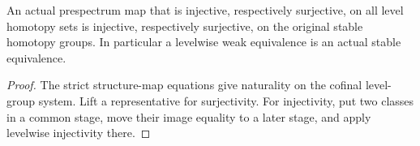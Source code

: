 \begin{proposition}
  \label{prop:actual-levelwise-stable-equivalences}
  \leanok
  An actual prespectrum map that is injective, respectively surjective, on all level homotopy sets is injective, respectively surjective, on the original stable homotopy groups. In particular a levelwise weak equivalence is an actual stable equivalence.
\end{proposition}
\begin{proof}
  The strict structure-map equations give naturality on the cofinal level-group system. Lift a representative for surjectivity. For injectivity, put two classes in a common stage, move their image equality to a later stage, and apply levelwise injectivity there.
  \leanok
\end{proof}

